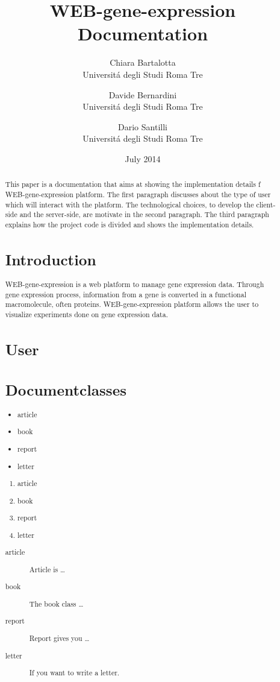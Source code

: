 \documentclass{article}
\title{WEB-gene-expression Documentation}
\author{Chiara Bartalotta  \\
	Universit\'a degli Studi Roma Tre  \\
	\and 
	Davide Bernardini \\
	Universit\'a degli Studi Roma Tre \\
	\and 
	Dario Santilli \\
	Universit\'a degli Studi Roma Tre \\
	}
\date{July 2014  }
\begin{document}
\maketitle


\begin{abstract}
This paper is a documentation that aims at showing the implementation details f WEB-gene-expression platform. The first paragraph discusses about the type of user which will interact with the platform. The technological choices, to develop the client-side and the server-side, are motivate in the second paragraph. The third paragraph explains how the project code is divided and shows the implementation details.


\section{Introduction}
WEB-gene-expression is a web platform to manage gene expression data. Through gene expression process, information from a gene is converted in a functional macromolecule, often proteins. WEB-gene-expression platform allows the user to visualize experiments done on gene expression data.

\section{User}





\section{Documentclasses} \label{documentclasses}

\begin{itemize}
\item article
\item book 
\item report 
\item letter 
\end{itemize}


\begin{enumerate}
\item article
\item book 
\item report 
\item letter 
\end{enumerate}

\begin{description}
\item[article\label{article}]{Article is \ldots}
\item[book\label{book}]{The book class \ldots}
\item[report\label{report}]{Report gives you \ldots}
\item[letter\label{letter}]{If you want to write a letter.}
\end{description}



\end{abstract}
\end{document}
